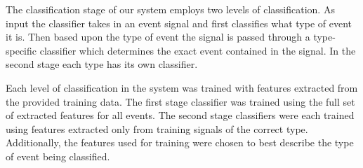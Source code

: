 The classification stage of our system employs two levels of classification. As input
the classifier takes in an event signal and first classifies what type of event it is.
Then based upon the type of event the signal is passed through a type-specific 
classifier which determines the exact event contained in the signal. In the second stage
each type has its own classifier.

Each level of classification in the system was trained with features extracted from the 
provided training data. The first stage classifier was trained using the full set of 
extracted features for all events. The second stage classifiers were each trained using 
features extracted only from training signals of the correct type. Additionally, the 
features used for training were chosen to best describe the type of event being classified.
